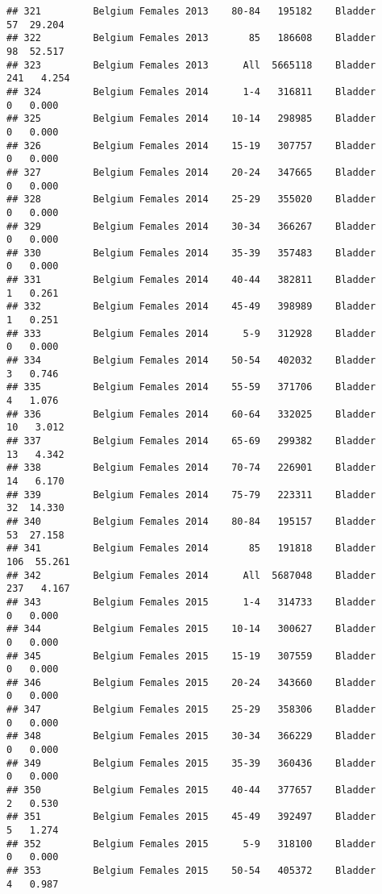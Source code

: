 \documentclass[
]{article}
\begin{document}
\begin{verbatim}
## 321         Belgium Females 2013    80-84   195182    Bladder     57  29.204
## 322         Belgium Females 2013       85   186608    Bladder     98  52.517
## 323         Belgium Females 2013      All  5665118    Bladder    241   4.254
## 324         Belgium Females 2014      1-4   316811    Bladder      0   0.000
## 325         Belgium Females 2014    10-14   298985    Bladder      0   0.000
## 326         Belgium Females 2014    15-19   307757    Bladder      0   0.000
## 327         Belgium Females 2014    20-24   347665    Bladder      0   0.000
## 328         Belgium Females 2014    25-29   355020    Bladder      0   0.000
## 329         Belgium Females 2014    30-34   366267    Bladder      0   0.000
## 330         Belgium Females 2014    35-39   357483    Bladder      0   0.000
## 331         Belgium Females 2014    40-44   382811    Bladder      1   0.261
## 332         Belgium Females 2014    45-49   398989    Bladder      1   0.251
## 333         Belgium Females 2014      5-9   312928    Bladder      0   0.000
## 334         Belgium Females 2014    50-54   402032    Bladder      3   0.746
## 335         Belgium Females 2014    55-59   371706    Bladder      4   1.076
## 336         Belgium Females 2014    60-64   332025    Bladder     10   3.012
## 337         Belgium Females 2014    65-69   299382    Bladder     13   4.342
## 338         Belgium Females 2014    70-74   226901    Bladder     14   6.170
## 339         Belgium Females 2014    75-79   223311    Bladder     32  14.330
## 340         Belgium Females 2014    80-84   195157    Bladder     53  27.158
## 341         Belgium Females 2014       85   191818    Bladder    106  55.261
## 342         Belgium Females 2014      All  5687048    Bladder    237   4.167
## 343         Belgium Females 2015      1-4   314733    Bladder      0   0.000
## 344         Belgium Females 2015    10-14   300627    Bladder      0   0.000
## 345         Belgium Females 2015    15-19   307559    Bladder      0   0.000
## 346         Belgium Females 2015    20-24   343660    Bladder      0   0.000
## 347         Belgium Females 2015    25-29   358306    Bladder      0   0.000
## 348         Belgium Females 2015    30-34   366229    Bladder      0   0.000
## 349         Belgium Females 2015    35-39   360436    Bladder      0   0.000
## 350         Belgium Females 2015    40-44   377657    Bladder      2   0.530
## 351         Belgium Females 2015    45-49   392497    Bladder      5   1.274
## 352         Belgium Females 2015      5-9   318100    Bladder      0   0.000
## 353         Belgium Females 2015    50-54   405372    Bladder      4   0.987

\end{verbatim}
\end{document}

